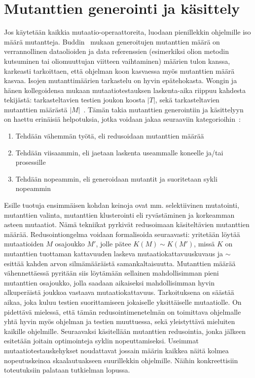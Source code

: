 \documentclass[finnish]{tktltiki2}
\begin{document}
\section{Mutanttien generointi ja käsittely}
Jos käytetään kaikkia mutaatio-operaattoreita, luodaan pienillekkin ohjelmille iso määrä mutantteja. Buddin~\cite{Budd} mukaan generoitujen mutanttien määrä on verrannollinen dataolioiden ja data referenssien (esimerkiksi olion metodin kutsuminen tai oliomuuttujan viitteen vaihtaminen) määrien tulon kanssa, karkeasti tarkoittaen, että ohjelman koon kasvaessa myös mutanttien määrä kasvaa. Isojen mutanttimäärien tarkastelu on hyvin epätehokasta. Wongin ja hänen kollegoidensa mukaan mutaatiotestauksen laskenta-aika riippuu kahdesta tekijästä: tarkasteltavien testien joukon koosta $|T|$, sekä tarkasteltavien mutanttien määrästä $|M|$~\cite{Wong93onmutation}. Tämän takia mutanttien generointiin ja käsittelyyn on haettu erinäisiä helpotuksia, jotka voidaan jakaa seuraaviin kategorioihin~\cite{Hussain08}:
\begin{enumerate}
\item Tehdään vähemmän työtä, eli redusoidaan mutanttien määrää
\item Tehdään viisaammin, eli jaetaan laskenta useammalle koneelle ja/tai prosessille
\item Tehdään nopeammin, eli generoidaan mutantit ja suoritetaan sykli nopeammin
\end{enumerate}
Esille tuotuja ensimmäisen kohdan keinoja ovat mm. selektiivinen mutatointi, mutanttien valinta, mutanttien klusterointi eli ryvästäminen ja korkeamman asteen mutaatiot. Nämä tekniikat pyrkivät redusoimaan käsiteltävien mutanttien määrää. Redusointiongelma voidaan formalisoida seuraavasti: yritetään löytää mutaatioiden $M$ osajoukko $M'$, jolle pätee $K(M) \sim K(M')$, missä $K$ on mutanttien tuottaman kattavuuden laskeva mutaatiokattavuuskuvaus ja $\sim$ esittää kahden arvon silmämääräistä samankaltaisuutta. Mutanttien määrää vähennettäessä pyritään siis löytämään sellainen mahdollisimman pieni mutanttien osajoukko, jolla saadaan aikaiseksi mahdollisimman hyvin alkuperäistä joukkoa vastaava mutaatiokattavuus. Tarkoituksena on säästää aikaa, joka kuluu testien suorittamiseen jokaiselle yksittäiselle mutaatiolle. On pidettävä mielessä, että tämän redusointimenetelmän on toimittava ohjelmalle yhtä hyvin myös ohjelman ja testien muuttuessa, sekä yleistyttävä mieluiten kaikille ohjelmille. Seuraavaksi käsitellään mutanttien redusointia, jonka jälkeen esitetään joitain optimointeja syklin nopeuttamiseksi. Useimmat mutaatiotestauskehykset noudattavat jossain määrin kaikkea näitä kolmea nopeutuskeinoa skaalautuakseen suurillekkin ohjelmille. Näihin konkreettisiin toteutuksiin palataan tutkielman lopussa.
\end{document}
